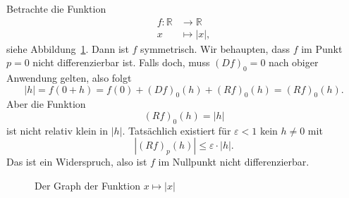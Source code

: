 \documentclass[../main.tex]{subfiles}
\begin{document}
\begin{example}
  Betrachte die Funktion
  \begin{align*}
    f \colon \mathbb{R} & \to \mathbb{R} \\
    x & \mapsto |x|,
  \end{align*}
  siehe Abbildung~\ref{fig:modulus}.
  Dann ist $f$ symmetrisch. Wir behaupten, dass
  $f$ im Punkt $p = 0$ nicht differenzierbar ist.
  Falls doch, muss ${(Df)}_0 = 0$ nach obiger
  Anwendung gelten, also
  folgt
  \[
    |h| = f(0 + h) = f(0) + {(Df)}_0(h) + {(Rf)}_0(h)
    = {(Rf)}_0(h).
  \]
  Aber die Funktion
  \[
    {(Rf)}_0(h) = |h|
  \]
  ist nicht relativ klein in $|h|$. Tatsächlich existiert
  für $\varepsilon < 1$ kein $h \neq 0$ mit
  \[
    |{(Rf)}_p(h)| \leq \varepsilon \cdot |h|.
  \]
  Das ist ein Widerspruch, also ist $f$ im Nullpunkt
  nicht differenzierbar.
\end{example}

\begin{figure}[htb]
  \centering
  
  \caption{Der Graph der Funktion $x \mapsto |x|$}%
  \label{fig:modulus}
\end{figure}
\end{document}
